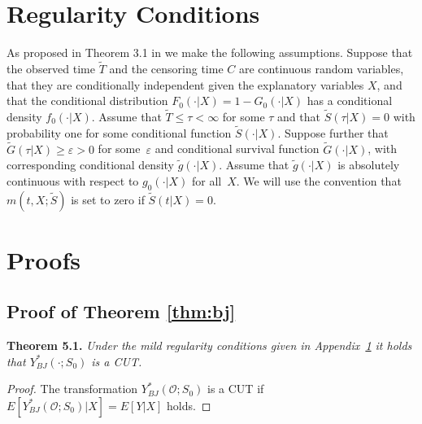 \documentclass[12pt, a4paper]{scrartcl}
\theoremstyle{definition}
\theoremstyle{plain}
\numberwithin{equation}{section}
\numberwithin{figure}{section}
\numberwithin{table}{section}
\begin{document}
	\begin{appendices}
		\section{Regularity Conditions}\label{regcond}
		As proposed in Theorem 3.1 in \citet*{drcut} we make the following assumptions.
		Suppose that the observed time $\tilde T$ and the censoring time $C$ are continuous random variables, that they are conditionally independent given the explanatory variables $X$, and that the conditional distribution $F_0(\cdot \vert X) = 1 - G_0(\cdot \vert X)$ has a conditional density $f_0(\cdot \vert X)$.
		Assume that $\tilde T \leq \tau < \infty$ for some $\tau$ and that $\tilde{S}(\tau \vert X)=0$ with probability one for some conditional function $\tilde{S}(\cdot \vert X)$.
		Suppose further that $\tilde{G}(\tau \vert X)\geq \varepsilon > 0$ for some~$\varepsilon$ and conditional survival function $\tilde{G}(\cdot \vert X)$, with corresponding conditional density $\tilde{g}(\cdot\vert X)$.
		Assume that $\tilde{g}(\cdot\vert X)$ is absolutely continuous with respect to $g_0(\cdot\vert X)$ for all~$X$.
		We will use the convention that $m(t,X;\tilde{S})$ is set to zero if $\tilde{S}(t \vert X)=0$.
		\section{Proofs}
		\subsection{Proof of Theorem \ref{thm:bj}}\label{proof:bjcut}
		\textbf{Theorem {5.1.}} \textit{Under the mild regularity conditions given in Appendix~\ref{regcond} it holds that $Y_{BJ}^*(\cdot; S_0)$ is a CUT.}
		\begin{proof}
			The transformation $Y_{BJ}^*(\mathcal{O}; S_0)$ is a CUT if $E[Y_{BJ}^*(\mathcal{O}; S_0)\vert X] = E[Y\vert X]$ holds.
			

\end{proof}
\end{appendices}
\end{document}
